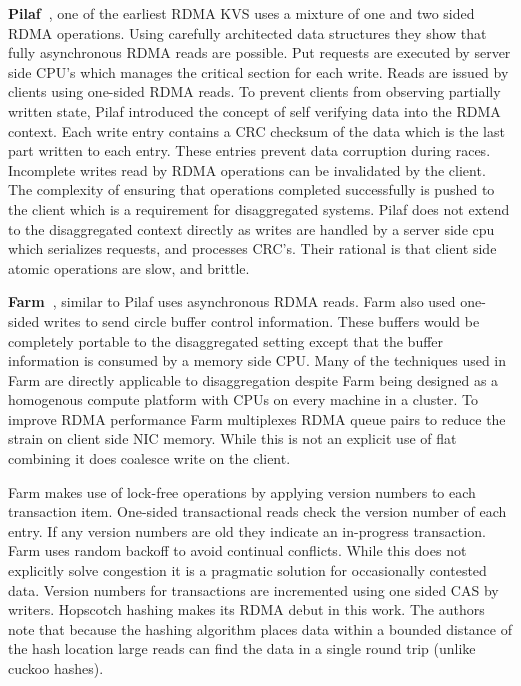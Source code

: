 \textbf{Pilaf~\cite{pilaf}}, one of the earliest RDMA KVS uses a mixture of one
and two sided RDMA operations. Using carefully architected data structures they
show that fully asynchronous RDMA reads are possible. Put requests are executed
by server side CPU's which manages the critical section for each write. Reads
are issued by clients using one-sided RDMA reads. To prevent clients from
observing partially written state, Pilaf introduced the concept of self
verifying data into the RDMA context. Each write entry contains a CRC checksum
of the data which is the last part written to each entry.  These entries prevent
data corruption during races. Incomplete writes read by RDMA operations can be
invalidated by the client. The complexity of ensuring that operations completed
successfully is pushed to the client which is a requirement for disaggregated
systems.  Pilaf does not extend to the disaggregated context directly as writes
are handled by a server side cpu which serializes requests, and processes CRC's.
Their rational is that client side atomic operations are slow, and brittle. 


\textbf{Farm~\cite{farm}}, similar to Pilaf uses asynchronous RDMA reads. Farm
also used one-sided writes to send circle buffer control information. These
buffers would be completely portable to the disaggregated setting except that
the buffer information is consumed by a memory side CPU. Many of the techniques
used in Farm are directly applicable to disaggregation despite Farm being
designed as a homogenous compute platform with CPUs on every machine in a
cluster. To improve RDMA performance Farm multiplexes RDMA queue pairs to reduce
the strain on client side NIC memory.  While this is not an explicit use of flat
combining it does coalesce write on the client.



Farm makes use of lock-free operations by applying version numbers to each
transaction item. One-sided transactional reads check the version number of each
entry. If any version numbers are old they indicate an in-progress transaction.
Farm uses random backoff to avoid continual conflicts. While this does not
explicitly solve congestion it is a pragmatic solution for occasionally
contested data. Version numbers for transactions are incremented using one sided
CAS by writers. Hopscotch hashing makes its RDMA debut in this work. The authors
note that because the hashing algorithm places data within a bounded distance of
the hash location large reads can find the data in a single round trip (unlike cuckoo hashes).


